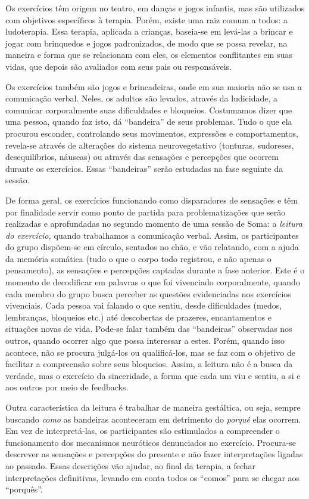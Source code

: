 Os exercícios têm origem no teatro, em danças e jogos infantis, mas são
utilizados com objetivos específicos à terapia. Porém, existe uma raiz
comum a todos: a ludoterapia. Essa terapia, aplicada a crianças,
baseia-se em levá-las a brincar e jogar com brinquedos e jogos
padronizados, de modo que se possa revelar, na maneira e forma que se
relacionam com eles, os elementos conflitantes em suas vidas, que depois
são avaliados com seus pais ou responsáveis.

Os exercícios também são jogos e brincadeiras, onde em sua maioria não
se usa a comunicação verbal. Neles, os adultos são levados, através da
ludicidade, a comunicar corporalmente suas dificuldades e bloqueios.
Costumamos dizer que uma pessoa, quando faz isto, dá ``bandeira'' de
seus problemas. Tudo o que ela procurou esconder, controlando seus
movimentos, expressões e comportamentos, revela-se através de alterações
do sistema neurovegetativo (tonturas, sudoreses, desequilíbrios,
náuseas) ou através das sensações e percepções que ocorrem durante os
exercícios. Essas ``bandeiras'' serão estudadas na fase seguinte da
sessão.

De forma geral, os exercícios funcionando como disparadores de sensações
e têm por finalidade servir como ponto de partida para problematizações
que serão realizadas e aprofundadas no segundo momento de uma sessão de
Soma: a \emph{leitura do exercício,} quando trabalhamos a comunicação
verbal. Assim, os participantes do grupo dispõem-se em círculo, sentados
no chão, e vão relatando, com a ajuda da memória somática (tudo o que o
corpo todo registrou, e não apenas o pensamento), as sensações e
percepções captadas durante a fase anterior. Este é o momento de
decodificar em palavras o que foi vivenciado corporalmente, quando cada
membro do grupo busca perceber as questões evidenciadas nos exercícios
vivenciais. Cada pessoa vai falando o que sentiu, desde dificuldades
(medos, lembranças, bloqueios etc.) até descobertas de prazeres,
encantamentos e situações novas de vida. Pode-se falar também das
``bandeiras'' observadas nos outros, quando ocorrer algo que possa
interessar a estes. Porém, quando isso acontece, não se procura
julgá-los ou qualificá-los, mas se faz com o objetivo de facilitar a
compreensão sobre seus bloqueios. Assim, a leitura não é a busca da
verdade, mas o exercício da sinceridade, a forma que cada um viu e
sentiu, a si e aos outros por meio de feedbacks.

Outra característica da leitura é trabalhar de maneira gestáltica, ou
seja, sempre buscando \emph{como} as bandeiras aconteceram em detrimento
do \emph{porquê} elas ocorrem. Em vez de interpretá-las, os
participantes são estimulados a compreender o funcionamento dos
mecanismos neuróticos denunciados no exercício. Procura-se descrever as
sensações e percepções do presente e não fazer interpretações ligadas ao
passado. Essas descrições vão ajudar, ao final da terapia, a fechar
interpretações definitivas, levando em conta todos os ``comos'' para se
chegar aos ``porquês''.

